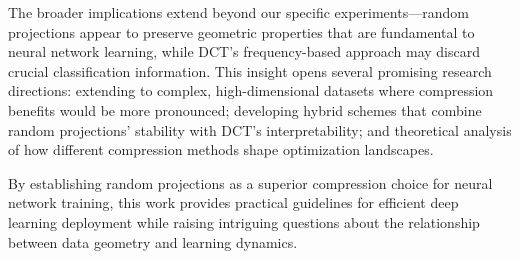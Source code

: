 \documentclass{article} %
\begin{document}
The broader implications extend beyond our specific experiments---random projections appear to preserve geometric properties that are fundamental to neural network learning, while DCT's frequency-based approach may discard crucial classification information. This insight opens several promising research directions: extending to complex, high-dimensional datasets where compression benefits would be more pronounced; developing hybrid schemes that combine random projections' stability with DCT's interpretability; and theoretical analysis of how different compression methods shape optimization landscapes.

By establishing random projections as a superior compression choice for neural network training, this work provides practical guidelines for efficient deep learning deployment while raising intriguing questions about the relationship between data geometry and learning dynamics.



\end{document}

